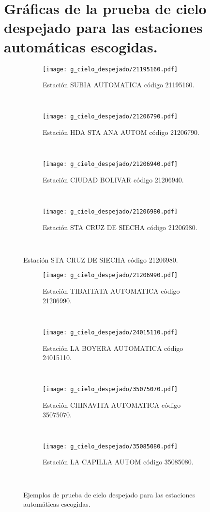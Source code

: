 \appendix
\clearpage
\addappheadtotoc
\appendixpage

\chapter{Gráficas de la prueba de cielo despejado para las estaciones automáticas escogidas.}


\begin{figure}[H]
\begin{subfigure}[normla]{0.45\textwidth}
\texttt{[image: g\_cielo\_despejado/21195160.pdf]}
\caption{Estación SUBIA AUTOMATICA código 21195160.}
\end{subfigure}
~
\begin{subfigure}[normla]{0.45\textwidth}
\texttt{[image: g\_cielo\_despejado/21206790.pdf]}
\caption{Estación HDA STA ANA AUTOM código 21206790.}
\end{subfigure}
~
\begin{subfigure}[normla]{0.45\textwidth}
\texttt{[image: g\_cielo\_despejado/21206940.pdf]}
\caption{Estación CIUDAD BOLIVAR código 21206940.}
\end{subfigure}
~
\begin{subfigure}[normla]{0.45\textwidth}
\texttt{[image: g\_cielo\_despejado/21206980.pdf]}
\caption{Estación STA CRUZ DE SIECHA código 21206980.}
\end{subfigure}
~
\end{figure}
           
\begin{figure}[]\ContinuedFloat
\centering
\begin{subfigure}[normla]{0.45\textwidth}
\texttt{[image: g\_cielo\_despejado/21206990.pdf]}
\caption{Estación TIBAITATA AUTOMATICA código 21206990.}
\end{subfigure}
~
\begin{subfigure}[normla]{0.45\textwidth}
\texttt{[image: g\_cielo\_despejado/24015110.pdf]}
\caption{Estación LA BOYERA AUTOMATICA código 24015110.}
\end{subfigure}
~

\begin{subfigure}[normla]{0.45\textwidth}
\texttt{[image: g\_cielo\_despejado/35075070.pdf]}
\caption{Estación CHINAVITA AUTOMATICA código 35075070.}
\end{subfigure}
~
\begin{subfigure}[normla]{0.45\textwidth}
\texttt{[image: g\_cielo\_despejado/35085080.pdf]}
\caption{Estación LA CAPILLA AUTOM código 35085080.}
\end{subfigure}
~
    \caption{Ejemplos de prueba de cielo despejado para las estaciones automáticas escogidas.}
    \label{fig:my_label}
\end{figure}


